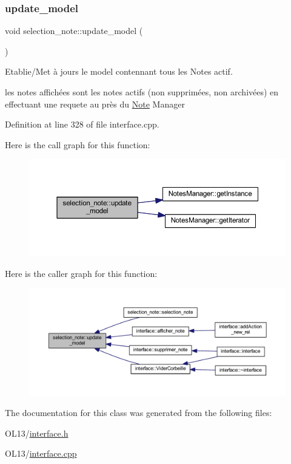 \subsubsection{\texorpdfstring{update\+\_\+model}{update\_model}}
{\footnotesize\ttfamily void selection\+\_\+note\+::update\+\_\+model (\begin{DoxyParamCaption}{ }\end{DoxyParamCaption})\hspace{0.3cm}{\ttfamily [slot]}}



Etablie/\+Met à jours le model contennant tous les Notes actif. 

les notes affichées sont les notes actifs (non supprimées, non archivées) en effectuant une requete au près du \hyperlink{class_note}{Note} Manager 

Definition at line 328 of file interface.\+cpp.

Here is the call graph for this function\+:\nopagebreak
\begin{figure}[H]
\begin{center}
\leavevmode
\includegraphics[width=350pt]{classselection__note_aab004424eba4264628d2e01108f2e63b_cgraph}
\end{center}
\end{figure}
Here is the caller graph for this function\+:\nopagebreak
\begin{figure}[H]
\begin{center}
\leavevmode
\includegraphics[width=350pt]{classselection__note_aab004424eba4264628d2e01108f2e63b_icgraph}
\end{center}
\end{figure}


The documentation for this class was generated from the following files\+:\begin{DoxyCompactItemize}
\item 
O\+L13/\hyperlink{interface_8h}{interface.\+h}\item 
O\+L13/\hyperlink{interface_8cpp}{interface.\+cpp}\end{DoxyCompactItemize}
